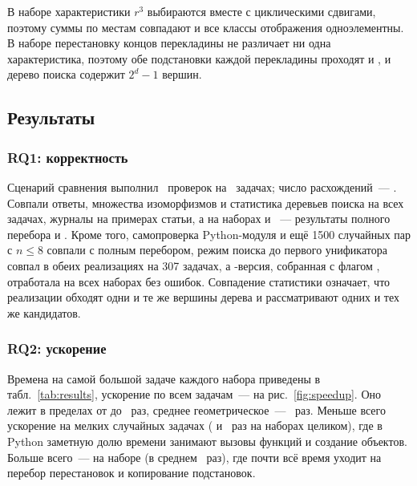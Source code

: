 В наборе  характеристики $r^3$ выбираются вместе с циклическими сдвигами, поэтому суммы по местам совпадают и все классы отображения одноэлементны.
В наборе  перестановку концов перекладины не различает ни одна характеристика, поэтому обе подстановки каждой перекладины проходят  и , и дерево поиска содержит $2^d - 1$ вершин.

\subsection{Результаты}

\subsubsection{RQ1: корректность}

Сценарий сравнения выполнил \NChecks{}~проверок на \NCases{}~задачах; число расхождений~--- \NMismatches.
Совпали ответы, множества изоморфизмов и статистика деревьев поиска на всех задачах, журналы на примерах статьи, а на наборах  и ~--- результаты полного перебора и \ISOMone{}.
Кроме того, самопроверка Python-модуля и ещё 1500 случайных пар с $n \le 8$ совпали с полным перебором, режим поиска до первого унификатора совпал в обеих реализациях на 307 задачах, а \Cpp{}-версия, собранная с флагом \mbox{}, отработала на всех наборах без ошибок.
Совпадение статистики означает, что реализации обходят одни и те же вершины дерева и рассматривают одних и тех же кандидатов.

\subsubsection{RQ2: ускорение}

Времена на самой большой задаче каждого набора приведены в табл.~\ref{tab:results}, ускорение по всем задачам~--- на рис.~\ref{fig:speedup}.
Оно лежит в пределах от \SpeedupMin{} до \SpeedupMax{}~раз, среднее геометрическое~--- \SpeedupGeo{}~раз.
Меньше всего ускорение на мелких случайных задачах (\SpeedupRandom{} и \SpeedupRandomMid{}~раз на наборах целиком), где в Python заметную долю времени занимают вызовы функций и создание объектов.
Больше всего~--- на наборе  (в среднем \GmeanBrothers{}~раз), где почти всё время уходит на перебор перестановок и копирование подстановок.

